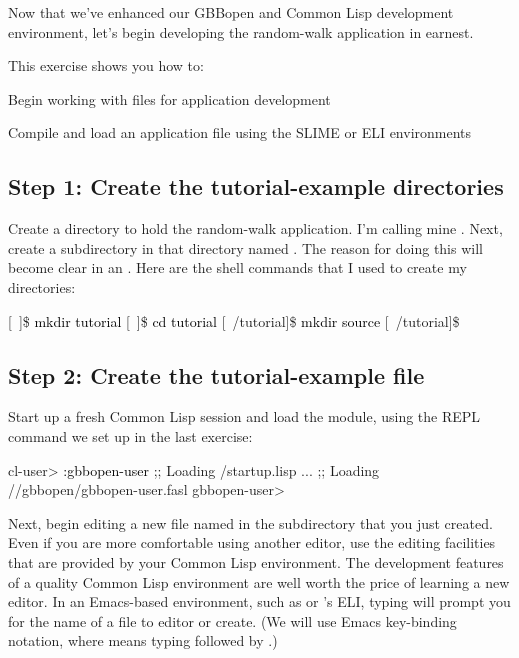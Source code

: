 \documentclass[10pt,twoside,english,pdftex]{article}
\begin{document}
Now that we've enhanced our GBBopen and Common Lisp development environment,
let's begin developing the random-walk application in earnest.

\fndocrule

This exercise shows you how to:
\begin{tightitemize}
\item Begin working with files for application development
\item Compile and load an application file using the SLIME or ELI
  environments
\end{tightitemize}

\fndocrule

\subsection*{Step 1: Create the tutorial-example directories}

Create a directory to hold the random-walk application.  I'm calling mine
.  Next, create a subdirectory in that directory named
.  The reason for doing this will become clear in an
. Here are the shell commands
that I used to create my directories:
%
\W\supp
\begin{example}
\textcolor{darkergray}{%
  [~]\$ \textcolor{black}{mkdir tutorial}
  [~]\$ \textcolor{black}{cd tutorial}
  [~/tutorial]\$ \textcolor{black}{mkdir source}
  [~/tutorial]\$}
\end{example}

\subsection*{Step 2: Create the tutorial-example file}

Start up a fresh Common Lisp session and load the 
module, using the REPL command we set up in the last exercise:
%
\W\supp
\begin{example}
\textcolor{darkergray}{%
  cl-user> \textcolor{black}{:gbbopen-user}
  ;; Loading /startup.lisp
     ...
  ;; Loading //gbbopen/gbbopen-user.fasl
  gbbopen-user>}
\end{example}

Next, begin editing a new file named  in
the  subdirectory that you just created.  Even if you are more
comfortable using another editor, use the editing facilities that are provided
by your Common Lisp environment.  The development features of a quality Common
Lisp environment are well worth the price of learning a new editor.  In an
Emacs-based environment, such as
 or 's ELI, typing  will prompt
you for the name of a file to editor or create.  (We will use Emacs
key-binding notation, where  means typing 
followed by {}.)
\end{document}
